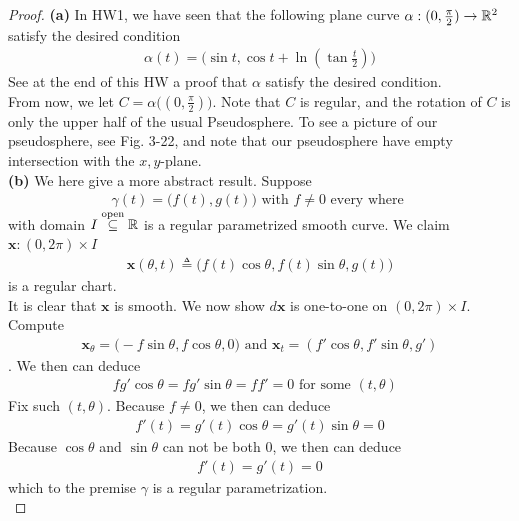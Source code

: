 \documentclass{report}
\begin{document}
\begin{proof}
\textbf{(a)} In HW1, we have seen that the following plane curve $\alpha :(0,\frac{\pi}{2})\rightarrow \mathbb{R}^2$ satisfy the desired condition 
\begin{align*}
\alpha (t)=\Big(\sin t, \cos t + \ln (\tan \frac{t}{2}) \Big)
\end{align*}
See at the end of this HW a proof that $\alpha $ satisfy the desired condition.\\


From now, we let $C= \alpha \Big((0, \frac{\pi}{2}) \Big)$. Note that $C$ is regular, and the rotation of  $C$ is only the upper half of the usual Pseudosphere. To see a picture of our pseudosphere, see Fig. 3-22, and note that our pseudosphere have empty intersection with the  $x,y$-plane.\\

\textbf{(b)} We here give a more abstract result. Suppose 
\begin{align*}
\gamma (t)=\Big(f(t),g(t) \Big) \text{ with $f\neq 0$ every where }
\end{align*}
with domain $I\overset{\text{open}}{\subseteq}\mathbb{R}$ is a regular parametrized smooth curve. We claim $\textbf{x}:(0, 2\pi) \times I$ 
\begin{align*}
\textbf{x}(\theta, t)\triangleq \Big(f(t)\cos \theta, f(t)\sin \theta,g(t)  \Big)
\end{align*}
is a regular chart.\\

It is clear that $\textbf{x}$ is smooth. We now show $d\textbf{x}$ is one-to-one on $(0, 2\pi) \times I $. Compute 
\begin{align*}
\textbf{x}_\theta= \Big(- f \sin \theta , f \cos \theta , 0 \Big)\text{ and }\textbf{x}_t= (f'\cos \theta, f' \sin \theta ,g')
\end{align*}
. We then can deduce
\begin{align*}
f g' \cos \theta = f g' \sin \theta = f f' =0\text{ for some $(t,\theta)$ }
\end{align*}
Fix such $(t, \theta)$. Because $f\neq 0$, we then can deduce 
\begin{align*}
f'(t)=g'(t)\cos \theta = g' (t) \sin \theta =0 
\end{align*}
Because $\cos \theta$ and $\sin \theta$ can not be both $0$, we then can deduce 
 \begin{align*}
f'(t)=g'(t)=0
\end{align*}
which \CaC to the premise $\gamma $ is a regular parametrization.\\


\end{proof}
\end{document}
